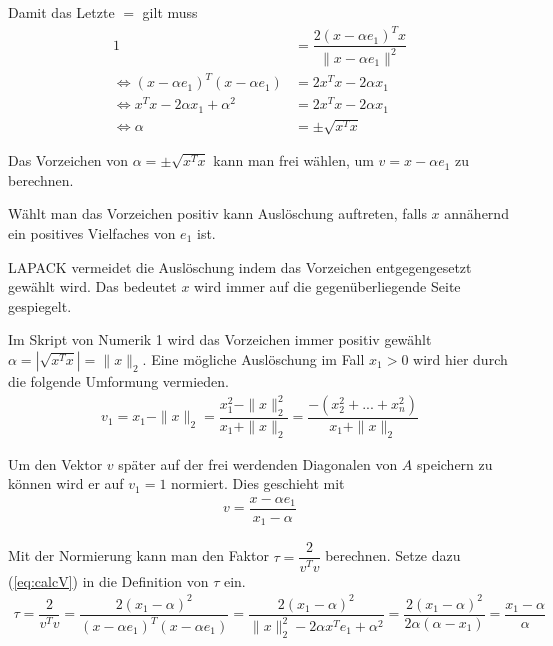 Damit das Letzte	 $=$ gilt muss 
\begin{align*}
	1 &= \dfrac{2(x - \alpha e_1)^Tx}{\|x - \alpha e_1\|^2}\\
	\Leftrightarrow (x - \alpha e_1)^T(x - \alpha e_1) &= 2 x^T x - 2\alpha x_1 \\
	\Leftrightarrow x^Tx -2\alpha x_1 + \alpha^2 &= 2 x^T x - 2\alpha x_1\\
	\Leftrightarrow \alpha &= \pm \sqrt{x^Tx}
\end{align*}

Das Vorzeichen von  $\alpha = \pm \sqrt{x^Tx}$ kann man frei wählen, um $ v = x - \alpha e_1$ zu berechnen.



Wählt man das Vorzeichen positiv kann Auslöschung auftreten, falls $x$ annähernd ein positives Vielfaches von $e_1$ ist.

LAPACK \cite{DGEQR2} vermeidet die Auslöschung indem das Vorzeichen entgegengesetzt gewählt wird. Das bedeutet $x$ wird immer auf die gegenüberliegende Seite gespiegelt.

Im Skript von Numerik 1 \cite{num1} wird das Vorzeichen immer positiv gewählt\\ $\alpha = |\sqrt{x^Tx}| = \|x\|_2$. Eine mögliche Auslöschung im Fall $ x_1 > 0$ wird hier durch die folgende Umformung vermieden.
\begin{align*}
	v_1 = x_1 - \|x\|_2 = \dfrac{x_1^2 - \|x\|_2^2}{x_1 + \|x\|_2}
	=\dfrac{-(x_2^2+...+x_n^2)}{x_1 + \|x\|_2}
\end{align*}



Um den Vektor $v$ später auf der frei werdenden Diagonalen von $A$ speichern zu können wird er auf $v_1 = 1$ normiert. Dies geschieht mit 
\begin{align}
	v = \dfrac{x - \alpha e_1}{x_1 - \alpha}
	\label{eq:calcV}
\end{align}

Mit der Normierung kann man den Faktor $\tau = \dfrac{2}{v^Tv}$ berechnen. Setze dazu (\ref{eq:calcV}) in die Definition von $\tau$ ein.
\begin{align*}
	\tau = \dfrac{2}{v^Tv} = \dfrac{2 (x_1 - \alpha)^2}{(x - \alpha e_1)^T (x - \alpha e_1)} = \dfrac{2 (x_1 - \alpha)^2}{\|x\|^2_2 - 2\alpha x^Te_1 + \alpha^2} =  \dfrac{2 (x_1 - \alpha)^2}{ 2\alpha (\alpha - x_1)} = \dfrac{x_1 - \alpha}{\alpha}
\end{align*}

